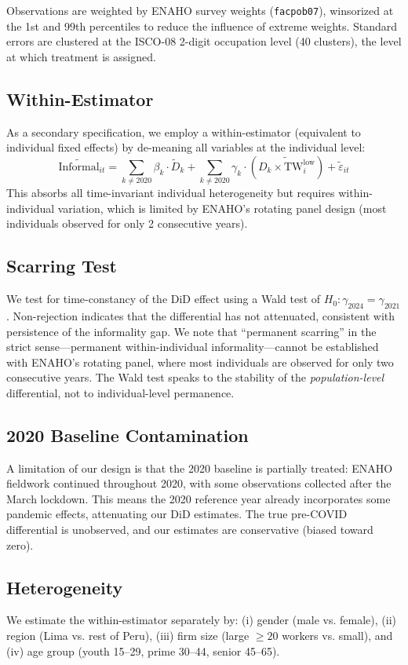Observations are weighted by ENAHO survey weights (\texttt{facpob07}), winsorized at the 1st and 99th percentiles to reduce the influence of extreme weights. Standard errors are clustered at the ISCO-08 2-digit occupation level (40 clusters), the level at which treatment is assigned.

\subsection{Within-Estimator}

As a secondary specification, we employ a within-estimator (equivalent to individual fixed effects) by de-meaning all variables at the individual level:
\begin{equation}
    \widetilde{\text{Informal}}_{it} = \sum_{k \neq 2020} \beta_k \cdot \widetilde{D}_k + \sum_{k \neq 2020} \gamma_k \cdot (\widetilde{D_k \times \text{TW}^{\text{low}}_i}) + \widetilde{\varepsilon}_{it}
    \label{eq:fe}
\end{equation}
This absorbs all time-invariant individual heterogeneity but requires within-individual variation, which is limited by ENAHO's rotating panel design (most individuals observed for only 2 consecutive years).

\subsection{Scarring Test}

We test for time-constancy of the DiD effect using a Wald test of $H_0: \gamma_{2024} = \gamma_{2021}$. Non-rejection indicates that the differential has not attenuated, consistent with persistence of the informality gap. We note that ``permanent scarring'' in the strict sense---permanent within-individual informality---cannot be established with ENAHO's rotating panel, where most individuals are observed for only two consecutive years. The Wald test speaks to the stability of the \textit{population-level} differential, not to individual-level permanence.

\subsection{2020 Baseline Contamination}

A limitation of our design is that the 2020 baseline is partially treated: ENAHO fieldwork continued throughout 2020, with some observations collected after the March lockdown. This means the 2020 reference year already incorporates some pandemic effects, attenuating our DiD estimates. The true pre-COVID differential is unobserved, and our estimates are conservative (biased toward zero).

\subsection{Heterogeneity}

We estimate the within-estimator separately by: (i) gender (male vs. female), (ii) region (Lima vs. rest of Peru), (iii) firm size (large $\geq 20$ workers vs. small), and (iv) age group (youth 15--29, prime 30--44, senior 45--65).

